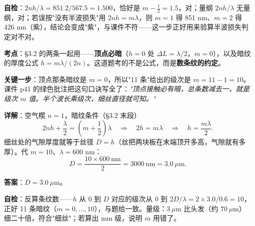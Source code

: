 \documentclass[10pt]{ctexart}
\renewcommand{\qbreak}{\needspace{0.50\textheight}}
\begin{document}
\textbf{自检}：$2nh/\lambda=851.2/567.5=1.500$，恰好是 $m-\frac12=1.5$，对；量纲 $2nh/\lambda$ 无量纲，对；若误按"没有半波损失"用 $2nh=m\lambda$，则 $m=1$ 得 851 nm、$m=2$ 得 426 nm（紫），结论会变成"紫"，与课件不符——这一步正好用来验算半波损失判定对不对。


\qbreak
{}

\textbf{考点}：\S3.2 的两条一起用——\textbf{顶点必暗}（$h=0$ 处 $\Delta L=\lambda/2$，$m=0$），以及暗纹的厚度公式 $h=m\lambda/(2n)$。这道题考的不是公式，而是\textbf{数条纹的约定}。

\textbf{关键一步}：顶点那条暗纹是 $m=0$，所以"11 条"给出的级次是 $m=11-1=10$。课件 p41 的绿色批注把这句口诀写全了：\emph{"顶点接触必有暗，总条数减去一，就是级次 $m$ 值。半个波长乘级次，细丝直径就可知。"}

\textbf{详解}：空气楔 $n=1$，暗纹条件（\S3.2 末段）
\[
2nh+\frac{\lambda}{2}=\left(m+\frac12\right)\lambda
\quad\Longrightarrow\quad
2h=m\lambda
\quad\Longrightarrow\quad
h=\frac{m\lambda}{2}. \tag{8.2}
\]
细丝处的气隙厚度就等于丝径 $D=h$（丝把两块板在末端顶开多高，气隙就有多厚）。代 $m=10$、$\lambda=600$ nm：
\[
D=\frac{10\times600\ \mathrm{nm}}{2}=3000\ \mathrm{nm}=3.0\ \mu\mathrm{m}. \tag{8.3}
\]

\textbf{答案}：$D=3.0\ \mu\mathrm{m}$。

\textbf{自检}：反算条纹数——$h$ 从 $0$ 到 $D$ 对应的级次从 $0$ 到 $2D/\lambda=2\times3.0/0.6=10$，正好 11 条暗纹（$m=0,\dots,10$），与题给一致。量级：$3\ \mu$m 比头发（约 $70\ \mu$m）细二十倍，符合"细丝"；若算出 mm 级，说明 $m$ 用错了。



\qbreak
{}
\end{document}
